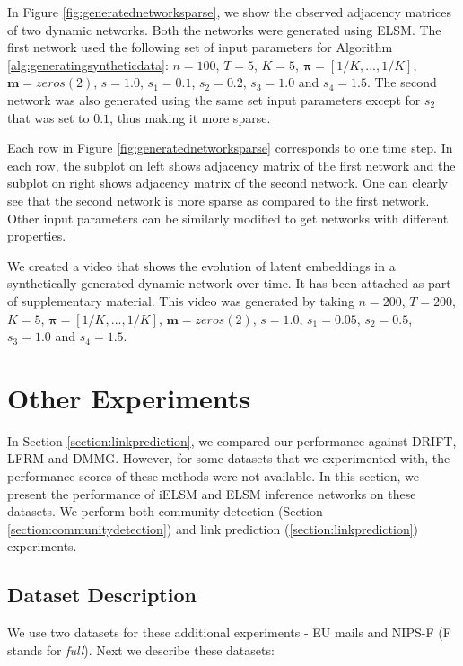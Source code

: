 \documentclass[letterpaper]{article} %
\begin{document}
In Figure \ref{fig:generatednetworksparse}, we show the observed adjacency matrices of two dynamic networks. Both the networks were generated using ELSM. The first network used the following set of input parameters for Algorithm \ref{alg:generatingsyntheticdata}: $n=100$, $T=5$, $K=5$, $\mathbf{\pi}=[1/K, ..., 1/K]$, $\mathbf{m}=zeros(2)$, $s=1.0$, $s_1=0.1$, $s_2=0.2$, $s_3=1.0$ and $s_4=1.5$. The second network was also generated using the same set input parameters except for $s_2$ that was set to $0.1$, thus making it more sparse.

Each row in Figure \ref{fig:generatednetworksparse} corresponds to one time step. In each row, the subplot on left shows adjacency matrix of the first network and the subplot on right shows adjacency matrix of the second network. One can clearly see that the second network is more sparse as compared to the first network. Other input parameters can be similarly modified to get networks with different properties.

We created a video that shows the evolution of latent embeddings in a synthetically generated dynamic network over time. It has been attached as part of supplementary material. This video was generated by taking $n=200$, $T=200$, $K=5$, $\mathbf{\pi}=[1/K, ..., 1/K]$, $\mathbf{m}=zeros(2)$, $s=1.0$, $s_1=0.05$, $s_2=0.5$, $s_3=1.0$ and $s_4=1.5$.

\iffalse
\section{Other Experiments}
\label{appendix:otherexperiments}
In Section \ref{section:linkprediction}, we compared our performance against DRIFT, LFRM and DMMG. However, for some datasets that we experimented with, the performance scores of these methods were not available. In this section, we present the performance of iELSM and ELSM inference networks on these datasets. We perform both community detection (Section \ref{section:communitydetection}) and link prediction (\ref{section:linkprediction}) experiments.


\subsection{Dataset Description}
\label{appendix:datasetdescription}
We use two datasets for these additional experiments - EU mails and NIPS-F (F stands for \textit{full}). Next we describe these datasets:
\end{document}

